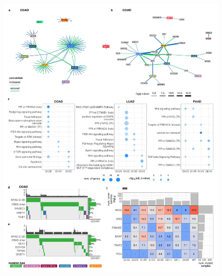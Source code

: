 \documentclass[english, 10pt, letterpaper]{article}
\begin{document}
\begin{figure}[h!]
\centering
\includegraphics[width=180mm]{figures/Fig_2.jpeg}
\label{fig:comutation-main}
\end{figure}
\end{document}
